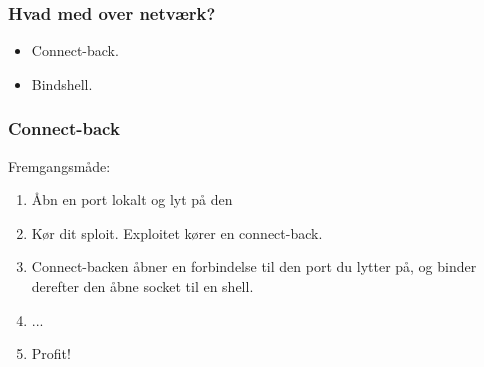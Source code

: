 \documentclass[slidestop,compress,mathserif, xcolor=table]{beamer}
\begin{document}
\begin{frame}[c]
    \frametitle{Hvad med over netværk?}

    \begin{itemize}
    \item Connect-back.
    \item Bindshell.
    \end{itemize}



\end{frame}




\begin{frame}[c]
  \frametitle{Connect-back}
  Fremgangsmåde:
  \begin{enumerate}
  \item<+-> Åbn en port lokalt og lyt på den
    
  \item<+-> Kør dit sploit. Exploitet kører en connect-back.
  \item<+-> Connect-backen åbner en forbindelse til den port du lytter på, og
    binder derefter den åbne socket til en shell.
  \item<+-> ...
  \item<+-> Profit!
  \end{enumerate}
\end{frame}
\end{document}
